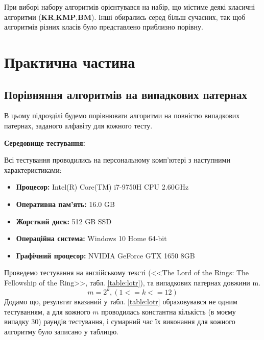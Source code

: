 \documentclass[a4paper,14pt]{extarticle} %
\begin{document}
	При виборі набору алгоритмів орієнтувався на набір, що містиме деякі класичні алгоритми (\textbf{KR},\textbf{KMP},\textbf{BM}). Інші обирались серед більш сучасних, так щоб алгоритмів різних класів було представлено приблизно порівну.

	
	\newpage
	\section{Практична частина}
	
	\subsection{Порівняння алгоритмів на випадкових патернах}
	В цьому підрозділі будемо порівнювати алгоритми на повністю випадкових патернах, заданого алфавіту для кожного тесту. 

	\textbf{Середовище тестування:}

	Всі тестування проводились на персональному комп'ютері з наступними характеристиками:
	\begin{itemize}
		\item \textbf{Процесор:} Intel(R) Core(TM) i7-9750H CPU 2.60GHz
		\item \textbf{Оперативна пам'ять:} 16.0 GB
		\item \textbf{Жорсткий диск:} 512 GB SSD
		\item \textbf{Операційна система:} Windows 10 Home 64-bit
		\item \textbf{Графічний процесор:} NVIDIA GeForce GTX 1650 8GB
	\end{itemize}

	Проведемо тестування на англійському тексті (<<The Lord of the Rings: The Fellowship of the Ring>>, табл. \ref{table:lotr}), та випадкових патернах довжини m. $$m=2^k, (1<=k<=12)$$
	Додамо що, результат вказаний у табл. \ref{table:lotr} обраховувався не одним тестуванням, а для кожного $m$ проводилась константна кількість (в моєму випадку 30) раундів тестування, і сумарний час їх виконання для кожного алгоритму було записано у таблицю.
\end{document}
